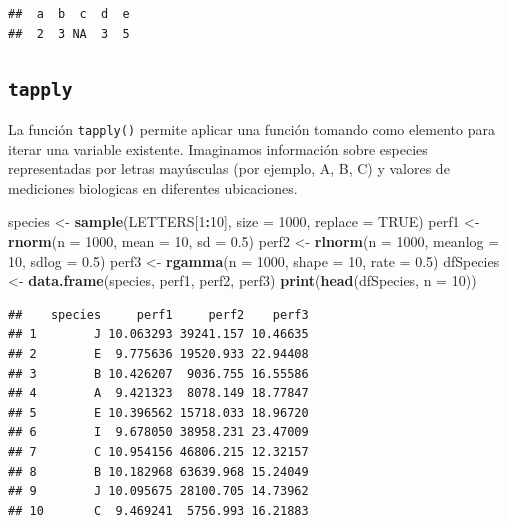 \documentclass[
]{book}
\newenvironment{Shaded}{\begin{snugshade}}{\end{snugshade}}
\newcommand{\DataTypeTok}[1]{\textcolor[rgb]{0.13,0.29,0.53}{#1}}
\newcommand{\DecValTok}[1]{\textcolor[rgb]{0.00,0.00,0.81}{#1}}
\newcommand{\FloatTok}[1]{\textcolor[rgb]{0.00,0.00,0.81}{#1}}
\newcommand{\KeywordTok}[1]{\textcolor[rgb]{0.13,0.29,0.53}{\textbf{#1}}}
\newcommand{\NormalTok}[1]{#1}
\newcommand{\OperatorTok}[1]{\textcolor[rgb]{0.81,0.36,0.00}{\textbf{#1}}}
\newcommand{\OtherTok}[1]{\textcolor[rgb]{0.56,0.35,0.01}{#1}}
\newcommand{\StringTok}[1]{\textcolor[rgb]{0.31,0.60,0.02}{#1}}
\begin{document}
\begin{verbatim}
##  a  b  c  d  e 
##  2  3 NA  3  5
\end{verbatim}

\hypertarget{l17tapply}{%
\subsection{\texorpdfstring{\texttt{tapply}}{tapply}}\label{l17tapply}}

La función \texttt{tapply()} permite aplicar una función tomando como elemento para iterar una variable existente. Imaginamos información sobre especies representadas por letras mayúsculas (por ejemplo, A, B, C) y valores de mediciones biologicas en diferentes ubicaciones.

\begin{Shaded}
\begin{Highlighting}[]
\NormalTok{species <-}\StringTok{ }\KeywordTok{sample}\NormalTok{(LETTERS[}\DecValTok{1}\OperatorTok{:}\DecValTok{10}\NormalTok{], }\DataTypeTok{size =} \DecValTok{1000}\NormalTok{, }\DataTypeTok{replace =} \OtherTok{TRUE}\NormalTok{)}
\NormalTok{perf1 <-}\StringTok{ }\KeywordTok{rnorm}\NormalTok{(}\DataTypeTok{n =} \DecValTok{1000}\NormalTok{, }\DataTypeTok{mean =} \DecValTok{10}\NormalTok{, }\DataTypeTok{sd =} \FloatTok{0.5}\NormalTok{)}
\NormalTok{perf2 <-}\StringTok{ }\KeywordTok{rlnorm}\NormalTok{(}\DataTypeTok{n =} \DecValTok{1000}\NormalTok{, }\DataTypeTok{meanlog =} \DecValTok{10}\NormalTok{, }\DataTypeTok{sdlog =} \FloatTok{0.5}\NormalTok{)}
\NormalTok{perf3 <-}\StringTok{ }\KeywordTok{rgamma}\NormalTok{(}\DataTypeTok{n =} \DecValTok{1000}\NormalTok{, }\DataTypeTok{shape =} \DecValTok{10}\NormalTok{, }\DataTypeTok{rate =} \FloatTok{0.5}\NormalTok{)}
\NormalTok{dfSpecies <-}\StringTok{ }\KeywordTok{data.frame}\NormalTok{(species, perf1, perf2, perf3)}
\KeywordTok{print}\NormalTok{(}\KeywordTok{head}\NormalTok{(dfSpecies, }\DataTypeTok{n =} \DecValTok{10}\NormalTok{))}
\end{Highlighting}
\end{Shaded}

\begin{verbatim}
##    species     perf1     perf2    perf3
## 1        J 10.063293 39241.157 10.46635
## 2        E  9.775636 19520.933 22.94408
## 3        B 10.426207  9036.755 16.55586
## 4        A  9.421323  8078.149 18.77847
## 5        E 10.396562 15718.033 18.96720
## 6        I  9.678050 38958.231 23.47009
## 7        C 10.954156 46806.215 12.32157
## 8        B 10.182968 63639.968 15.24049
## 9        J 10.095675 28100.705 14.73962
## 10       C  9.469241  5756.993 16.21883
\end{verbatim}
\end{document}
